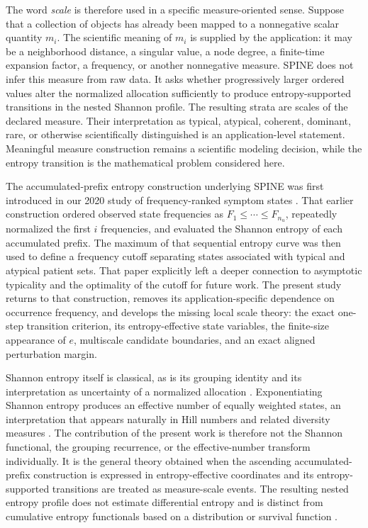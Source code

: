 \documentclass[aip,cha,reprint,superscriptaddress,floatfix]{revtex4-2}
\theoremstyle{definition}
\theoremstyle{remark}
\begin{document}
The word \emph{scale} is therefore used in a specific measure-oriented sense. Suppose that a collection of objects has already been mapped to a nonnegative scalar quantity \(m_i\). The scientific meaning of \(m_i\) is supplied by the application: it may be a neighborhood distance, a singular value, a node degree, a finite-time expansion factor, a frequency, or another nonnegative measure. SPINE does not infer this measure from raw data. It asks whether progressively larger ordered values alter the normalized allocation sufficiently to produce entropy-supported transitions in the nested Shannon profile. The resulting strata are scales of the declared measure. Their interpretation as typical, atypical, coherent, dominant, rare, or otherwise scientifically distinguished is an application-level statement. Meaningful measure construction remains a scientific modeling decision, while the entropy transition is the mathematical problem considered here.

The accumulated-prefix entropy construction underlying SPINE was first introduced in our 2020 study of frequency-ranked symptom states \cite{almomani2020symptoms}. That earlier construction ordered observed state frequencies as \(F_1\leq\cdots\leq F_{n_u}\), repeatedly normalized the first \(i\) frequencies, and evaluated the Shannon entropy of each accumulated prefix. The maximum of that sequential entropy curve was then used to define a frequency cutoff separating states associated with typical and atypical patient sets. That paper explicitly left a deeper connection to asymptotic typicality and the optimality of the cutoff for future work. The present study returns to that construction, removes its application-specific dependence on occurrence frequency, and develops the missing local scale theory: the exact one-step transition criterion, its entropy-effective state variables, the finite-size appearance of \(e\), multiscale candidate boundaries, and an exact aligned perturbation margin.

Shannon entropy itself is classical, as is its grouping identity and its interpretation as uncertainty of a normalized allocation \cite{shannon1948,coverthomas2006}. Exponentiating Shannon entropy produces an effective number of equally weighted states, an interpretation that appears naturally in Hill numbers and related diversity measures \cite{hill1973,jost2006}. The contribution of the present work is therefore not the Shannon functional, the grouping recurrence, or the effective-number transform individually. It is the general theory obtained when the ascending accumulated-prefix construction \cite{almomani2020symptoms} is expressed in entropy-effective coordinates and its entropy-supported transitions are treated as measure-scale events. The resulting nested entropy profile does not estimate differential entropy and is distinct from cumulative entropy functionals based on a distribution or survival function \cite{rao2004cumulative,dicrescenzo2009cumulative}.
\end{document}
